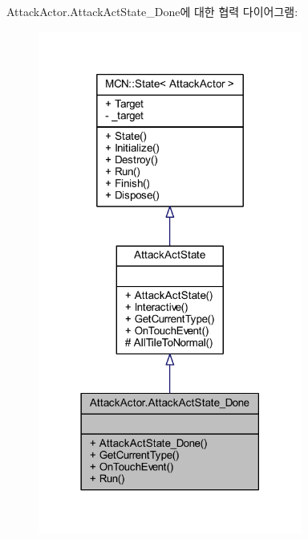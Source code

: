 Attack\+Actor.\+Attack\+Act\+State\+\_\+\+Done에 대한 협력 다이어그램\+:
\nopagebreak
\begin{figure}[H]
\begin{center}
\leavevmode
\includegraphics[width=246pt]{class_attack_actor_1_1_attack_act_state___done__coll__graph}
\end{center}
\end{figure}
